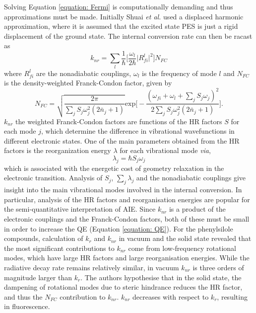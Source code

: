 Solving Equation \ref{equation: Fermi} is computationally demanding and thus approximations must be made. Initially Shuai \textit{et al.} used a displaced harmonic approximation, where it is assumed that the excited state \ac{PES} is just a rigid displacement of the ground state.\cite{Yui2005} The internal conversion rate can then be racast as
\begin{equation} \label{equation: displaced_harmonic}
    k_{nr}=\sum_{l}\frac{1}{\hbar}\bigg[\frac{\omega_{l}}{2\hbar{}}\big|R_{fi}^{l}\big|^{2}\bigg]N_{FC}
\end{equation}
where $R^{l}_{fi}$ are the nonadiabatic couplings, $\omega_{l}$ is the frequency of mode $l$ and $N_{FC}$ is the density-weighted Franck-Condon factor, given by
\begin{equation}\label{equation: NFC}
N_{FC}=\sqrt{\frac{2\pi}{\sum_{j}S_{j}\omega^{2}_{j}(2\bar{n}_{j}+1)}}\mathrm{exp}\bigg[-\frac{(\omega_{fi}+\omega_{l}+\sum_{j}S_{j}\omega_{j})^{2}}{2\sum_{j}S_{j}\omega_{j}^{2}(2\bar{n}_{j}+1)}\bigg].
\end{equation}
$k_{nr}$ the weighted Franck-Condon factors are functions of the \ac{HR} factors $S$ for each mode $j$, which determine the difference in vibrational wavefunctions in different electronic states. One of the main parameters obtained from the \ac{HR} factors is the reorganization energy $\lambda$ for each vibrational mode \textit{via},
\begin{equation}
    \lambda_{j}=\hbar{}S_{j}\omega_{j}
\end{equation}
which is associated with the energetic cost of geometry relaxation in the electronic transition. Analysis of $S_{j}$, $\sum_{j}\lambda_{j}$ and the nonadiabatic couplings give insight into the main vibrational modes involved in the internal conversion. In particular, analysis of the HR factors and reorganisation energies are popular for the semi-quantitative interpretation of AIE.\cite{Yin2006,Peng2007,Li2011,Peng2013,Shuai2014c,Shuai2014,Wu2014,Zhang2015a,Zheng2016,Fan2016,Zhang2016,Duan2017,Fan2017,Fan2018} Since $k_{nr}$ is a product of the electronic couplings and the Franck-Condon factors, both of these must be small in order to increase the QE (Equation \ref{equation: QE}). For the phenylsilole compounds, calculation of $k_{r}$ and $k_{nr}$ in vacuum and the solid state revealed that the most significant contributions to $k_{nr}$ come from low-frequency rotational modes, which have large \ac{HR} factors and large reorganisation energies. While the radiative decay rate remains relatively similar, in vacuum $k_{nr}$ is three orders of magnitude larger than $k_{r}$. The authors hypothesise that in the solid state, the dampening of rotational  modes due to steric hindrance reduces the \ac{HR} factor, and thus the $N_{FC}$ contribution to $k_{nr}$.\cite{Yui2005,Yin2006} $k_{nr}$ decreases with respect to $k_{r}$, resulting in fluorescence.

